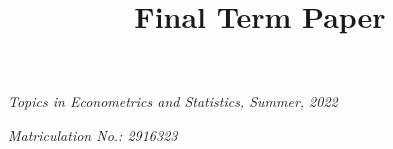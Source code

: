 \begin{frontmatter}

\title{Final Term Paper}

\vspace{0.5em}
\textit{Topics in Econometrics and Statistics, Summer, 2022}

\author{ }

\address{
Tim Mensinger\\
Institute for Financial Economics and Statistics\\
University of Bonn\\
Adenauerallee 24-42\\
53113 Bonn, Germany\\
\\
Matriculation No.: 2916323
}


\vspace{0.5em}
\textit{Matriculation No.: 2916323}

\vspace{2em}
\begin{abstract}
    
\end{abstract}

\end{frontmatter}
